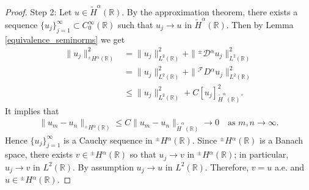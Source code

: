 \documentclass[leqno,final]{siamltex}
\numberwithin{equation}{section}
\renewcommand{\(}{\bigl(}
\renewcommand{\)}{\bigr)}
\newcommand{\R}{\mathbb{R}}
\begin{document}
\begin{proof}
            Step 2: Let $u \in \widetilde{H}^{\alpha}(\R)$. By the approximation theorem, there exists
            a sequence $\{u_j\}_{j=1}^{\infty} \subset C^{\infty}_{0}(\R)$ 
            such that $u_j \rightarrow u$ in $\widetilde{H}^{\alpha}(\R)$. Then by Lemma \ref{equivalence_seminorms} we get 
            \begin{align*}
                \|u_j\|_{{^{\pm}}{H}{^{\alpha}}(\R)}^{2} &= \|u_j\|_{L^{2}(\R)}^{2} + \|{^{\pm}}{\mathcal{D}}{^{\alpha}} u_j \|_{L^{2}(\R)}^{2} \\ 
                &= \|u_j\|_{L^{2}(\R)}^{2} + \|{^{\mathcal{F}}}{D}{^{\alpha}}u_j \|_{L^{2}(\R)}^{2} \\ 
                &\leq \|u_j\|_{L^{2}(\R)}^{2} + C [ u_j]_{\widetilde{H}^{\alpha} (\R)}^{2}.
            \end{align*}
            It implies that 
            \begin{align*}
                \|u_m - u_n \|_{{^{\pm}}{H}{^{\alpha}}(\R)} \leq C \| u_m - u_n \|_{\widetilde{H}^{\alpha}(\R)}  \to 0 \quad\mbox{as } m,n\to \infty.
            \end{align*}
            Hence $\{u_j\}_{j=1}^{\infty}$ is a Cauchy sequence in ${^{\pm}}{H}{^{\alpha}}(\R)$. Since ${^{\pm}}{H}{^{\alpha}}(\R)$ is a Banach space, there exists $v \in {^{\pm}}{H}{^{\alpha}}(\R)$ so that $u_j \rightarrow v$ in ${^{\pm}}{H}{^{\alpha}}(\R)$; in particular, $u_j \rightarrow v$ in $L^{2}(\R)$. By assumption $u_j \rightarrow u$ in $L^{2}(\R)$. Therefore, $v=u$ a.e. and $u \in {^{\pm}}{H}{^{\alpha}}(\R)$. 
        \end{proof}
    
\end{document}
